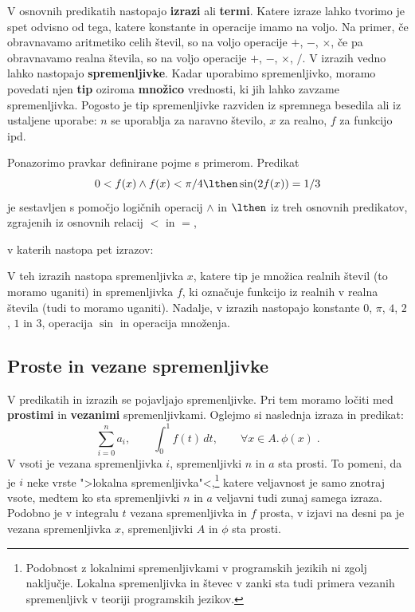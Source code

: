 V osnovnih predikatih nastopajo \textbf{izrazi} ali \textbf{termi}. Katere
izraze lahko tvorimo je spet odvisno od tega, katere konstante in
operacije imamo na voljo. Na primer, če obravnavamo aritmetiko celih
števil, so na voljo operacije $+$, $-$, $\times$, če pa obravnavamo
realna števila, so na voljo operacije $+$, $-$, $\times$, $/$. V
izrazih vedno lahko nastopajo \textbf{spremenljivke}. Kadar uporabimo
spremenljivko, moramo povedati njen \textbf{tip} oziroma \textbf{množico}
vrednosti, ki jih lahko zavzame spremenljivka. Pogosto je tip
spremenljivke razviden iz spremnega besedila ali iz ustaljene uporabe:
$n$ se uporablja za naravno število, $x$ za realno, $f$ za funkcijo
ipd.

Ponazorimo pravkar definirane pojme s primerom. Predikat
%
\begin{equation*}
  0 < f(x) \land f(x) < \pi/4 \lthen \sin(2 f(x)) = 1/3
\end{equation*}
%
je sestavljen s pomočjo logičnih operacij $\land$ in $\lthen$ iz treh
osnovnih predikatov, zgrajenih iz osnovnih relacij $<$ in $=$,
%
%
v katerih nastopa pet izrazov:
%
%
V teh izrazih nastopa spremenljivka $x$, katere tip je množica
realnih števil (to moramo uganiti) in spremenljivka $f$, ki označuje
funkcijo iz realnih v realna števila (tudi to moramo uganiti).
Nadalje, v izrazih nastopajo konstante $0$, $\pi$, $4$, $2$,
$1$ in $3$, operacija $\sin$ in operacija množenja.


\subsection{Proste in vezane spremenljivke}
\label{sec:spremenljivke}

V predikatih in izrazih se pojavljajo spremenljivke. Pri tem moramo
ločiti med \textbf{prostimi} in \textbf{vezanimi} spremenljivkami. Oglejmo
si naslednja izraza in predikat:
%
\begin{equation*}
  \sum_{i=0}^{n} a_i,
  \qquad
  \int_0^1 f(t) \, d t,
  \qquad
  \forall x \in A .\, \phi(x) \;.
\end{equation*}
%
V vsoti je vezana spremenljivka $i$, spremenljivki $n$ in $a$ sta
prosti. To pomeni, da je $i$ neke vrste ">lokalna
spremenljivka"<,\footnote{Podobnost z lokalnimi spremenljivkami v
  programskih jezikih ni zgolj naključje. Lokalna spremenljivka in
  števec v zanki sta tudi primera vezanih spremenljivk v teoriji
  programskih jezikov.} katere veljavnost je samo znotraj vsote,
medtem ko sta spremenljivki $n$ in $a$ veljavni tudi zunaj samega
izraza. Podobno je v integralu $t$ vezana spremenljivka in $f$ prosta,
v izjavi na desni pa je vezana spremenljivka $x$, spremenljivki $A$ in
$\phi$ sta prosti.

